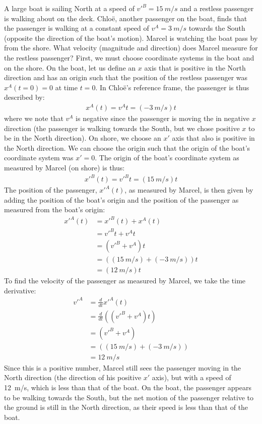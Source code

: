 \begin{example}{A large boat is sailing North at a speed of $v'^B=\SI{15}{m/s}$ and a restless passenger is walking about on the deck. Chlo\"e, another passenger on the boat, finds that the passenger is walking at a constant speed of $v^A=\SI{3}{m/s}$ towards the South (opposite the direction of the boat's motion). Marcel is watching the boat pass by from the shore. What velocity (magnitude and direction) does Marcel measure for the restless passenger?}
First, we must choose coordinate systems in the boat and on the shore. On the boat, let us define an $x$ axis that is positive in the North direction and has an origin such that the position of the restless passenger was $x^A(t=0)=0$ at time $t=0$. In Chlo\"e's reference frame, the passenger is thus described by:\\
\begin{align*}
x^A(t)=v^At=(\SI{-3}{m/s})t
\end{align*}
where we note that $v^A$ is negative since the passenger is moving the in negative $x$ direction (the passenger is walking towards the South, but we chose positive $x$ to be in the North direction). On shore, we choose an $x'$ axis that also is positive in the North direction. We can choose the origin such that the origin of the boat's coordinate system was $x'=0$. The origin of the boat's coordinate system as measured by Marcel (on shore) is thus:\\
\begin{align*}
x'^B(t)=v'^Bt=(\SI{15}{m/s})t
\end{align*}
The position of the passenger, $x'^A(t)$, as measured by Marcel, is then given by adding the position of the boat's origin and the position of the passenger as measured from the boat's origin:\\
\begin{align*}
x'^A(t) &= x'^B(t)+x^A(t)\\
&= v'^Bt + v^At \\
&= (v'^B+v^A)t\\
&= ((\SI{15}{m/s})+(\SI{-3}{m/s}))t\\
&= (\SI{12}{m/s})t
\end{align*}
To find the velocity of the passenger as measured by Marcel, we take the time derivative:\\
\begin{align*}
v'^A &= \frac{d}{dt}x'^A(t)\\
&= \frac{d}{dt} \left((v'^B+v^A)t\right)\\
&=(v'^B+v^A)\\
&=((\SI{15}{m/s})+(\SI{-3}{m/s}))\\
&=\SI{12}{m/s}
\end{align*}
Since this is a positive number, Marcel still sees the passenger moving in the North direction (the direction of his positive $x'$ axis), but with a speed of \SI{12}{m/s}, which is less than that of the boat. On the boat, the passenger appears to be walking towards the South, but the net motion of the passenger relative to the ground is still in the North direction, as their speed is less than that of the boat.
\end{example}



